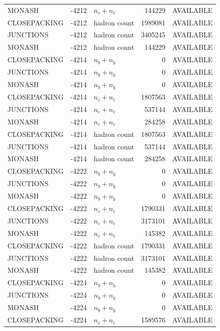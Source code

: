 \begin{landscape}
\begin{longtable}{@{}lrlrl@{}}
MONASH & -4212 & $n_c+n_{\bar c}$ & \num{144229} & AVAILABLE \\
CLOSEPACKING & -4212 & hadron count & \num{1989081} & AVAILABLE \\
JUNCTIONS & -4212 & hadron count & \num{3405245} & AVAILABLE \\
MONASH & -4212 & hadron count & \num{144229} & AVAILABLE \\
CLOSEPACKING & -4214 & $n_b+n_{\bar b}$ & \num{0} & AVAILABLE \\
JUNCTIONS & -4214 & $n_b+n_{\bar b}$ & \num{0} & AVAILABLE \\
MONASH & -4214 & $n_b+n_{\bar b}$ & \num{0} & AVAILABLE \\
CLOSEPACKING & -4214 & $n_c+n_{\bar c}$ & \num{1807563} & AVAILABLE \\
JUNCTIONS & -4214 & $n_c+n_{\bar c}$ & \num{537144} & AVAILABLE \\
MONASH & -4214 & $n_c+n_{\bar c}$ & \num{284258} & AVAILABLE \\
CLOSEPACKING & -4214 & hadron count & \num{1807563} & AVAILABLE \\
JUNCTIONS & -4214 & hadron count & \num{537144} & AVAILABLE \\
MONASH & -4214 & hadron count & \num{284258} & AVAILABLE \\
CLOSEPACKING & -4222 & $n_b+n_{\bar b}$ & \num{0} & AVAILABLE \\
JUNCTIONS & -4222 & $n_b+n_{\bar b}$ & \num{0} & AVAILABLE \\
MONASH & -4222 & $n_b+n_{\bar b}$ & \num{0} & AVAILABLE \\
CLOSEPACKING & -4222 & $n_c+n_{\bar c}$ & \num{1790331} & AVAILABLE \\
JUNCTIONS & -4222 & $n_c+n_{\bar c}$ & \num{3173101} & AVAILABLE \\
MONASH & -4222 & $n_c+n_{\bar c}$ & \num{145382} & AVAILABLE \\
CLOSEPACKING & -4222 & hadron count & \num{1790331} & AVAILABLE \\
JUNCTIONS & -4222 & hadron count & \num{3173101} & AVAILABLE \\
MONASH & -4222 & hadron count & \num{145382} & AVAILABLE \\
CLOSEPACKING & -4224 & $n_b+n_{\bar b}$ & \num{0} & AVAILABLE \\
JUNCTIONS & -4224 & $n_b+n_{\bar b}$ & \num{0} & AVAILABLE \\
MONASH & -4224 & $n_b+n_{\bar b}$ & \num{0} & AVAILABLE \\
CLOSEPACKING & -4224 & $n_c+n_{\bar c}$ & \num{1589576} & AVAILABLE \\

\end{longtable}
\end{landscape}
